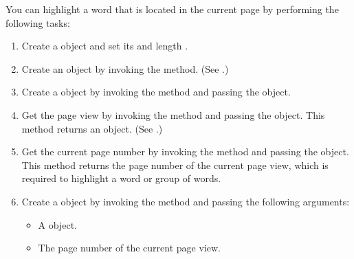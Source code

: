 \documentclass[letterpaper,12pt,english,openany,oneside]{sphinxmanual}
\begin{document}
You can highlight a word that is located in the current page by performing the following tasks:
\begin{enumerate}
%
\item {} 
Create a  object and set its  and length .

\item {} 
Create an  object by invoking the  method. (See .)

\item {} 
Create a  object by invoking the  method and passing the  object.

\item {} 
Get the page view by invoking the  method and passing the  object. This method returns an  object. (See .)

\item {} 
Get the current page number by invoking the  method and passing the  object. This method returns the page number of the current page view, which is required to highlight a word or group of words.

\item {} 
Create a  object by invoking the  method and passing the following arguments:
\begin{itemize}
\item {} 
A  object.

\item {} 
The page number of the current page view.

\end{itemize}

\end{enumerate}
\end{document}
